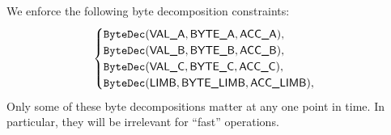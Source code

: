 We enforce the following byte decomposition constraints:
\[
	\begin{cases}
		\texttt{ByteDec}(\textsf{VAL\_A},  \textsf{BYTE\_A},    \textsf{ACC}\textsf{\_A}),    \\
		\texttt{ByteDec}(\textsf{VAL\_B},  \textsf{BYTE\_B},    \textsf{ACC}\textsf{\_B}),    \\
		\texttt{ByteDec}(\textsf{VAL\_C},  \textsf{BYTE\_C},    \textsf{ACC}\textsf{\_C}),    \\
		\texttt{ByteDec}(\textsf{LIMB},  \textsf{BYTE\_LIMB}, \textsf{ACC}\textsf{\_LIMB}), \\
	\end{cases}
\]
\saNote{} Only some of these byte decompositions matter at any one point in time. In particular, they will be irrelevant for ``fast'' operations.
